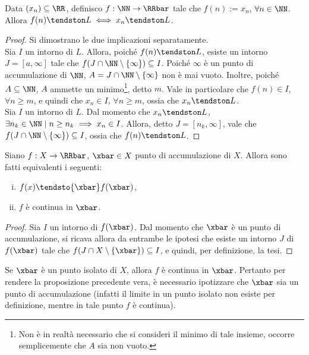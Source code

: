 \documentclass[11pt]{article}
\begin{document}
	\begin{proposition}
		Data $(x_n) \subseteq \RR$, definisco $f : \NN \to \RRbar$ tale
		che $f(n) := x_n$, $\forall n \in \NN$. Allora $f(n) \tendston L \iff x_n \tendston L$.
	\end{proposition}

	\begin{proof} Si dimostrano le due implicazioni separatamente. \\
		
		\rightproof Sia $I$ un intorno di $L$. Allora, poiché $f(n) \tendston L$,
		esiste un intorno $J = [a, \infty]$ tale che $f(J \cap \NN \setminus \{\infty\}) \subseteq I$.
		Poiché $\infty$ è un punto di accumulazione di $\NN$, $A = J \cap \NN \setminus \{\infty\}$ non è mai
		vuoto. Inoltre, poiché $A \subseteq \NN$, $A$ ammette un minimo\footnote{Non è in realtà necessario che
		si consideri il minimo di tale insieme, occorre semplicemente che $A$ sia non vuoto.}, detto $m$.
		Vale in particolare che
		$f(n) \in I$, $\forall n \geq m$, e quindi che $x_n \in I$, $\forall n \geq m$, ossia che $x_n \tendston L$. \\
		
		\leftproof Sia $I$ un intorno di $L$. Dal momento che $x_n \tendston L$, $\exists n_k \in \NN \mid n \geq n_k \implies
		x_n \in I$. Allora, detto $J = [n_k, \infty]$, vale che $f(J \cap \NN \setminus \{\infty\}) \subseteq I$, ossia
		che $f(n) \tendston L$.
	\end{proof}

	\begin{proposition}
		Siano $f : X \to \RRbar$, $\xbar \in X$ punto di accumulazione
		di $X$. Allora sono fatti equivalenti i seguenti:
		
		\begin{enumerate}[(i)]
			\item $f(x) \tendsto{\xbar} f(\xbar)$,
			\item $f$ è continua in $\xbar$.
		\end{enumerate}
	\end{proposition}

	\begin{proof}
		Sia $I$ un intorno di $f(\xbar)$. Dal momento che $\xbar$ è un punto di accumulazione, si ricava allora da
		entrambe le ipotesi che esiste un intorno $J$ di $f(\xbar)$ tale che
		$f(J \cap X \setminus \{\xbar\}) \subseteq I$, e quindi, per definizione, la tesi.
	\end{proof}

	\begin{remark}
		Se $\xbar$ è un punto isolato di $X$, allora $f$ è continua
		in $\xbar$. Pertanto per rendere la proposizione precedente
		vera, è necessario ipotizzare che $\xbar$ sia un punto
		di accumulazione (infatti il limite in un punto isolato
		non esiste per definizione, mentre in tale punto $f$ è
		continua).
	\end{remark}
\end{document}
